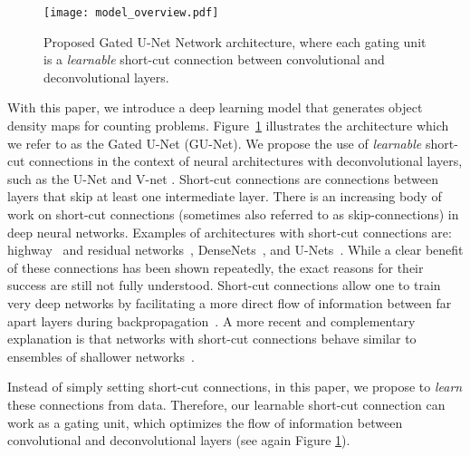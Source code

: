 \documentclass{bmvc2k}
\begin{document}
\begin{figure}
\centering
\texttt{[image: model\_overview.pdf]}
\caption{\label{fig:gated-architecture} Proposed Gated U-Net Network architecture, where each gating unit is a \emph{learnable} short-cut connection between convolutional and deconvolutional layers.}
\end{figure}

With this paper, we introduce a deep learning model that generates object density maps for counting problems. Figure~\ref{fig:gated-architecture} illustrates the architecture which we refer to as the Gated U-Net (GU-Net). We propose the use of \emph{learnable} short-cut connections in the context of neural architectures with deconvolutional layers, such as the U-Net \cite{unetRonnebergerFB15} and V-net \cite{MilletariNA16}. Short-cut connections are connections between layers that skip at least one intermediate layer. There is an increasing body of work on short-cut connections (sometimes also referred to as skip-connections) in deep neural networks. Examples of architectures with short-cut connections are: highway~\cite{Srivastava_2015_NIPS} and residual networks~\cite{he2016deep}, DenseNets~\cite{Huang_2017_CVPR}, and U-Nets~\cite{unetRonnebergerFB15}. While a clear benefit of these connections has been shown repeatedly, the exact reasons for their success are still not fully understood. Short-cut connections allow one to train very deep networks by facilitating a more direct flow of information between far apart layers during backpropagation~\cite{he2016deep}. A more recent and complementary explanation is that networks with short-cut connections behave similar to ensembles of shallower networks~\cite{veit16residual}.


Instead of simply setting short-cut connections, in this paper, we propose to \emph{learn} these connections from data. Therefore, our learnable short-cut connection can work as a gating unit, which optimizes the flow of information between convolutional and deconvolutional layers (see again Figure \ref{fig:gated-architecture}).
\end{document}
